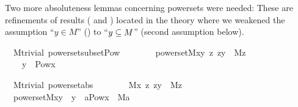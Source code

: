 Two more
absoluteness lemmas concerning powersets were needed: These are
refinements of results ( and
) located in the theory
where we weakened the assumption ``$y\in M$'' () to 
``$y\subseteq  M$'' (second assumption below).  
\begin{isabelle}
\isamarkupfalse%
\ {\isacharparenleft}\ M{\isacharunderscore}trivial{\isacharparenright}\ powerset{\isacharunderscore}subset{\isacharunderscore}Pow{\isacharcolon}\isanewline
\ \ \ \isanewline
\ \ \ \ {\isachardoublequoteopen}powerset{\isacharparenleft}M{\isacharcomma}x{\isacharcomma}y{\isacharparenright}{\isachardoublequoteclose}\ {\isachardoublequoteopen}{\isasymAnd}z{\isachardot}\ z{\isasymin}y\ {\isasymLongrightarrow}\ M{\isacharparenleft}z{\isacharparenright}{\isachardoublequoteclose}\isanewline
\ \ \ \isanewline
\ \ \ \ {\isachardoublequoteopen}y\ {\isasymsubseteq}\ Pow{\isacharparenleft}x{\isacharparenright}{\isachardoublequoteclose}
\end{isabelle}
\begin{isabelle}
\isamarkupfalse%
\ {\isacharparenleft}\ M{\isacharunderscore}trivial{\isacharparenright}\ powerset{\isacharunderscore}abs{\isacharcolon}\ \isanewline
\ \ \isanewline
\ \ \ \ {\isachardoublequoteopen}M{\isacharparenleft}x{\isacharparenright}{\isachardoublequoteclose}\ {\isachardoublequoteopen}{\isasymAnd}z{\isachardot}\ z{\isasymin}y\ {\isasymLongrightarrow}\ M{\isacharparenleft}z{\isacharparenright}{\isachardoublequoteclose}\isanewline
\ \ \isanewline
\ \ {\isachardoublequoteopen}powerset{\isacharparenleft}M{\isacharcomma}x{\isacharcomma}y{\isacharparenright}\ {\isasymlongleftrightarrow}\ y\ {\isacharequal}\ {\isacharbraceleft}a{\isasymin}Pow{\isacharparenleft}x{\isacharparenright}\ {\isachardot}\ M{\isacharparenleft}a{\isacharparenright}{\isacharbraceright}{\isachardoublequoteclose}
\end{isabelle}

